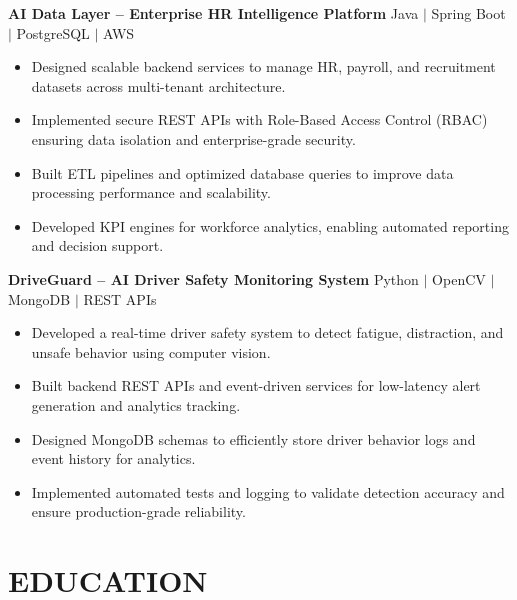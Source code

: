 \documentclass[a4paper,10pt]{article}
\begin{document}
\textbf{AI Data Layer -- Enterprise HR Intelligence Platform}
\hfill Java $\mid$ Spring Boot $\mid$ PostgreSQL $\mid$ AWS

\begin{itemize}[leftmargin=0.16in,itemsep=1.5pt,topsep=2pt]

\item Designed scalable backend services to manage HR, payroll, and recruitment datasets across multi-tenant architecture.

\item Implemented secure REST APIs with Role-Based Access Control (RBAC) ensuring data isolation and enterprise-grade security.

\item Built ETL pipelines and optimized database queries to improve data processing performance and scalability.

\item Developed KPI engines for workforce analytics, enabling automated reporting and decision support.

\end{itemize}

\textbf{DriveGuard -- AI Driver Safety Monitoring System}
\hfill Python $\mid$ OpenCV $\mid$ MongoDB $\mid$ REST APIs

\begin{itemize}[leftmargin=0.16in,itemsep=1.5pt,topsep=2pt]

\item Developed a real-time driver safety system to detect fatigue, distraction, and unsafe behavior using computer vision.

\item Built backend REST APIs and event-driven services for low-latency alert generation and analytics tracking.

\item Designed MongoDB schemas to efficiently store driver behavior logs and event history for analytics.

\item Implemented automated tests and logging to validate detection accuracy and ensure production-grade reliability.

\end{itemize}

\section*{EDUCATION}
\end{document}
